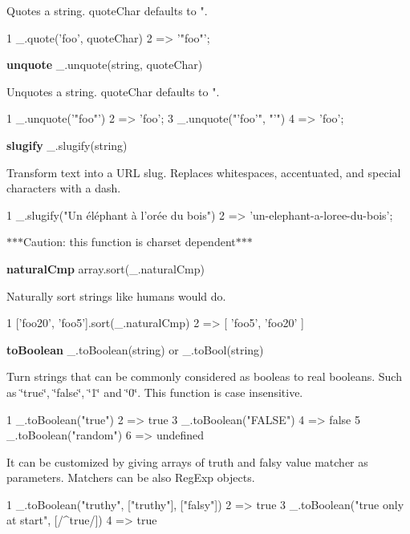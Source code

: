 Quotes a string. {\ttfamily quote\+Char} defaults to {\ttfamily "}.


\begin{DoxyCode}
1 \_.quote('foo', quoteChar)
2 => '"foo"';
\end{DoxyCode}
 {\bfseries unquote} \+\_\+.\+unquote(string, quote\+Char)

Unquotes a string. {\ttfamily quote\+Char} defaults to {\ttfamily "}.


\begin{DoxyCode}
1 \_.unquote('"foo"')
2 => 'foo';
3 \_.unquote("'foo'", "'")
4 => 'foo';
\end{DoxyCode}


{\bfseries slugify} \+\_\+.\+slugify(string)

Transform text into a U\+R\+L slug. Replaces whitespaces, accentuated, and special characters with a dash.


\begin{DoxyCode}
1 \_.slugify("Un éléphant à l'orée du bois")
2 => 'un-elephant-a-loree-du-bois';
\end{DoxyCode}


$\ast$$\ast$$\ast$\+Caution\+: this function is charset dependent$\ast$$\ast$$\ast$

{\bfseries natural\+Cmp} array.\+sort(\+\_\+.\+natural\+Cmp)

Naturally sort strings like humans would do.


\begin{DoxyCode}
1 ['foo20', 'foo5'].sort(\_.naturalCmp)
2 => [ 'foo5', 'foo20' ]
\end{DoxyCode}


{\bfseries to\+Boolean} \+\_\+.\+to\+Boolean(string) or \+\_\+.\+to\+Bool(string)

Turn strings that can be commonly considered as booleas to real booleans. Such as \char`\"{}true\char`\"{}, \char`\"{}false\char`\"{}, \char`\"{}1\char`\"{} and \char`\"{}0\char`\"{}. This function is case insensitive.


\begin{DoxyCode}
1 \_.toBoolean("true")
2 => true
3 \_.toBoolean("FALSE")
4 => false
5 \_.toBoolean("random")
6 => undefined
\end{DoxyCode}


It can be customized by giving arrays of truth and falsy value matcher as parameters. Matchers can be also Reg\+Exp objects.


\begin{DoxyCode}
1 \_.toBoolean("truthy", ["truthy"], ["falsy"])
2 => true
3 \_.toBoolean("true only at start", [/^true/])
4 => true
\end{DoxyCode}


